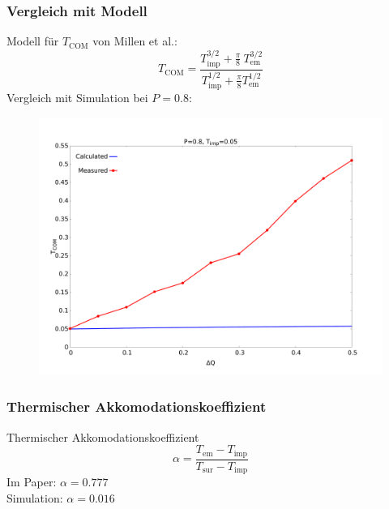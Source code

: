 \documentclass[handout]{beamer}
\begin{document}
\begin{frame}
\frametitle{Vergleich mit Modell}
Modell für $T_\text{COM}$ von Millen et al.:
\begin{equation}
    T_\text{COM} = \frac{T_\text{imp}^{3/2}+\tfrac\pi 8 \ T_\text{em}^{3/2}}{T_\text{imp}^{1/2}+\tfrac\pi8 T_\text{em}^{1/2}}
\end{equation}
Vergleich mit Simulation bei $P=0.8$:
\begin{figure}
    \begin{center}
        \includegraphics[scale=0.2]{../images/measurevscalc.pdf}
    \end{center}
\end{figure}
\end{frame}

\begin{frame}
\frametitle{Thermischer Akkomodationskoeffizient}
Thermischer Akkomodationskoeffizient
\begin{equation}
    \alpha = \frac{T_\text{em} - T_\text{imp}}{T_\text{sur} - T_\text{imp}}
\end{equation}
Im Paper: $\alpha = 0.777$ \\
Simulation: $\alpha = 0.016$

\end{frame}
\end{document}
